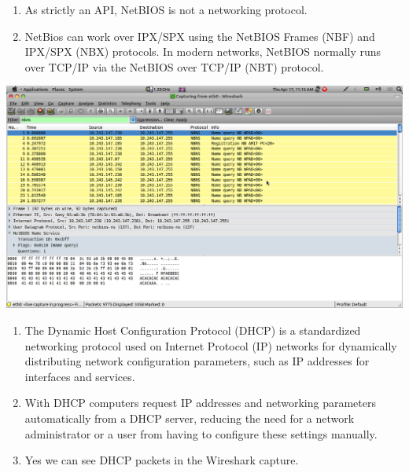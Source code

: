 \documentclass[a4paper,12pt,oneside]{article}
\begin{document}
\begin{enumerate}
\begin{enumerate}
\item As strictly an API, NetBIOS is not a networking protocol. 
\item NetBios can work over IPX/SPX using the NetBIOS Frames (NBF) and IPX/SPX (NBX) protocols. In modern networks, NetBIOS normally runs over TCP/IP via the NetBIOS over TCP/IP (NBT) protocol. 
\end{enumerate}

\begin{center}
 \includegraphics[width=13 cm,height=12 cm]{./nbns.png}
\end{center}
\end{enumerate}
\newpage
\begin{enumerate}
\item The Dynamic Host Configuration Protocol (DHCP) is a standardized networking protocol used on Internet Protocol (IP) networks 
for dynamically distributing network configuration parameters, such as IP addresses for interfaces and services.
\item With DHCP computers request IP addresses and networking parameters automatically from a DHCP server, reducing the need 
for a network administrator or a user from having to configure these settings manually.
\item Yes we can see DHCP packets in the Wireshark capture.

\end{enumerate}
 
\end{document}

